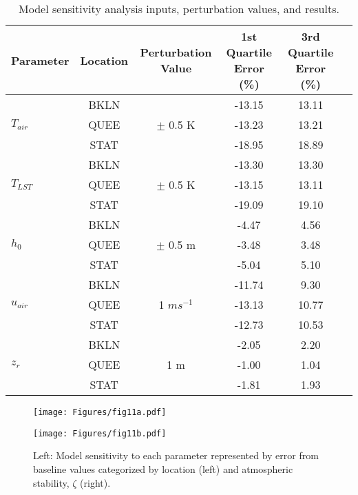 \begin{table}[!h]
\centering
\caption{Model sensitivity analysis inputs, perturbation values, and results.}
	\renewcommand{\arraystretch}{1}%
    \begin{tabular}[t]{lccccc}
        \hline
        Parameter & Location & Perturbation Value & 1st Quartile Error (\%) & 3rd Quartile Error (\%) \\
        \hline
        \multirow{3}{*}{$T_{air}$} & BKLN &   & -13.15 & 13.11 \\
                                   & QUEE & $\pm$ 0.5 K & -13.23 & 13.21 \\
                                   & STAT &   & -18.95 & 18.89 \\
        \multirow{3}{*}{$T_{LST}$} & BKLN &   & -13.30 & 13.30 \\
                                   & QUEE & $\pm$ 0.5 K & -13.15 & 13.11 \\
                                   & STAT &   & -19.09 & 19.10 \\
        \multirow{3}{*}{$h_0$} & BKLN &   & -4.47 & 4.56 \\
                                   & QUEE & $\pm$ 0.5 m & -3.48 & 3.48 \\
                                   & STAT &   & -5.04 & 5.10 \\
        \multirow{3}{*}{$u_{air}$} & BKLN &   & -11.74 & 9.30 \\
                                   & QUEE & 1 $m s^{-1}$ & -13.13 & 10.77 \\
                                   & STAT &   & -12.73 & 10.53 \\
        \multirow{3}{*}{$z_r$} & BKLN &   & -2.05 & 2.20 \\
                                   & QUEE & 1 m & -1.00 & 1.04 \\
                                   & STAT &   & -1.81 & 1.93 \\
        \hline
    \end{tabular}
    \label{tab:sensitivity-analysis-stats}
\end{table}%

\begin{figure}[!h]
    \centering
    \begin{minipage}{0.48\textwidth}
        \centering
        \texttt{[image: Figures/fig11a.pdf]} %
    \end{minipage}\hfill
    \begin{minipage}{0.48\textwidth}
        \centering
        \texttt{[image: Figures/fig11b.pdf]} %
    \end{minipage}\hfill
    \caption{Left: Model sensitivity to each parameter represented by error from baseline values categorized by location (left) and atmospheric stability, $\zeta$ (right).}
    \label{fig:sensitivity-study} 
\end{figure}


